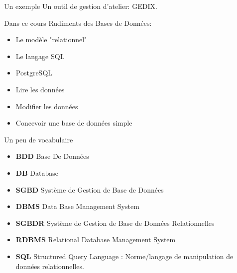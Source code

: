 \documentclass[xetex,dvipsnames]{beamer}
\begin{document}
\begin{frame}{Un exemple}
Un outil de gestion d'atelier: GEDIX.
\end{frame}

\begin{frame}{Dans ce cours}
Rudiments des Bases de Données:
\begin{itemize}
	\item Le modèle "relationnel"
	\item Le langage SQL
	\item PostgreSQL
	\item Lire les données
	\item Modifier les données
	\item Concevoir une base de données simple
\end{itemize}
\end{frame}



\begin{frame}{Un peu de vocabulaire}
	\begin{itemize}
		\item \textbf{BDD} Base De Données
		\item \textbf{DB} Database
	\end{itemize}
	\vspace{1em}
	\begin{itemize}
		\item \textbf{SGBD} Système de Gestion de Base de Données 
		\item \textbf{DBMS} Data Base Management System
	\end{itemize}
	\vspace{1em}
	\begin{itemize}
			\item \textbf{SGBDR} Système de Gestion de Base de Données Relationnelles
			\item \textbf{RDBMS} Relational Database Management System 
	\end{itemize}
	\vspace{1em}
	
	\begin{itemize}
		\item \textbf{SQL} Structured Query Language : Norme/langage de manipulation de données relationnelles.
	\end{itemize}
\end{frame}
\end{document}
